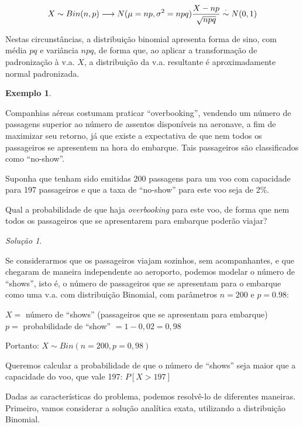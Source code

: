 \documentclass[
]{book}
\theoremstyle{definition}
\theoremstyle{definition}
\newtheorem{example}{Exemplo}[chapter]
\theoremstyle{definition}
\theoremstyle{remark}
\newtheorem*{solution}{Solução}
\begin{document}
\[X \sim Bin(n, p) \longrightarrow N(\mu = np, \sigma^2 = npq) \\ \frac{X - np}{\sqrt{npq}} \stackrel{\cdot}{\sim} N(0,1)\]

Nestas circunstâncias, a distribuição binomial apresenta forma de sino, com média \(pq\) e variância \(npq\), de forma que, ao aplicar a transformação de padronização à v.a. \(X\), a distribuição da v.a. resultante é aproximadamente normal padronizada.

\begin{example}
\protect\hypertarget{exm:unnamed-chunk-14}{}{\label{exm:unnamed-chunk-14} }
\end{example}

Companhias aéreas costumam praticar ``overbooking'', vendendo um número de passagens superior ao número de assentos disponíveis na aeronave, a fim de maximizar seu retorno, já que existe a expectativa de que nem todos os passageiros se apresentem na hora do embarque. Tais passageiros são classificados como ``no-show''.

Suponha que tenham sido emitidas 200 passagens para um voo com capacidade para 197 passageiros e que a taxa de ``no-show'' para este voo seja de 2\%.

Qual a probabilidade de que haja \emph{overbooking} para este voo, de forma que nem todos os passageiros que se apresentarem para embarque poderão viajar?

\begin{solution}
{}
\end{solution}

Se considerarmos que os passageiros viajam sozinhos, sem acompanhantes, e que chegaram de maneira independente ao aeroporto, podemos modelar o número de ``shows'', isto é, o número de passageiros que se apresentam para o embarque como uma v.a. com distribuição Binomial, com parâmetros \(n= 200\) e \(p = 0.98\):

\(X =\) número de ``shows'' (passageiros que se apresentam para embarque)\\
\(p =\) probabilidade de ``show'' \(= 1 - 0,02 = 0,98\)

Portanto: \(X \sim Bin ( n = 200, p = 0,98 )\)

Queremos calcular a probabilidade de que o número de ``shows'' seja maior que a capacidade do voo, que vale 197: \(P[X > 197]\)

Dadas as características do problema, podemos resolvê-lo de diferentes maneiras. Primeiro, vamos considerar a solução analítica exata, utilizando a distribuição Binomial.
\end{document}
